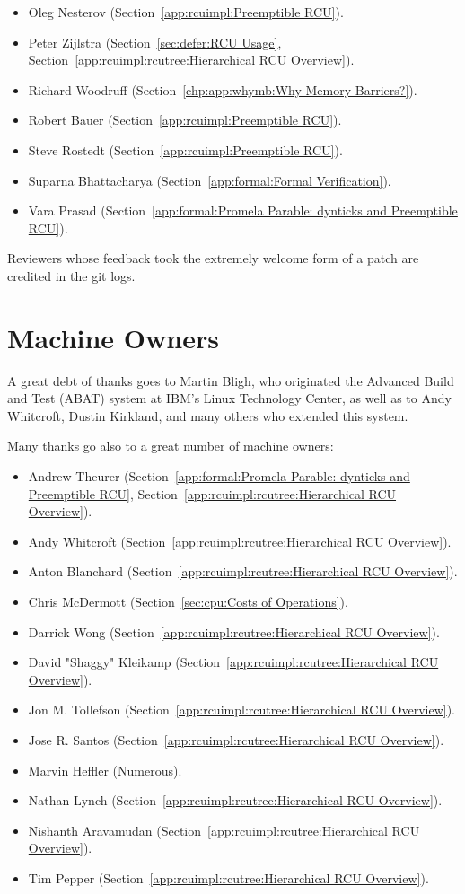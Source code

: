 \begin{itemize}
\item	Oleg Nesterov (Section~\ref{app:rcuimpl:Preemptible RCU}).
\item	Peter Zijlstra
	(Section~\ref{sec:defer:RCU Usage}, %
	Section~\ref{app:rcuimpl:rcutree:Hierarchical RCU Overview}).
\item	Richard Woodruff (Section~\ref{chp:app:whymb:Why Memory Barriers?}).
\item	Robert Bauer (Section~\ref{app:rcuimpl:Preemptible RCU}).
\item	Steve Rostedt (Section~\ref{app:rcuimpl:Preemptible RCU}).
\item	Suparna Bhattacharya
	(Section~\ref{app:formal:Formal Verification}).
\item	Vara Prasad
	(Section~\ref{app:formal:Promela Parable: dynticks and Preemptible RCU}).
\end{itemize}

Reviewers whose feedback took the extremely welcome form of a patch
are credited in the git logs.

\section{Machine Owners}

A great debt of thanks goes to Martin Bligh, who originated the
Advanced Build and Test (ABAT) system at IBM's Linux Technology
Center, as well as to Andy Whitcroft, Dustin Kirkland, and many
others who extended this system.

Many thanks go also to a great number of machine owners:

\begin{itemize}
\item	Andrew Theurer
	(Section~\ref{app:formal:Promela Parable: dynticks and Preemptible RCU},
	Section~\ref{app:rcuimpl:rcutree:Hierarchical RCU Overview}).
\item	Andy Whitcroft (Section~\ref{app:rcuimpl:rcutree:Hierarchical RCU Overview}).
\item	Anton Blanchard (Section~\ref{app:rcuimpl:rcutree:Hierarchical RCU Overview}).
\item	Chris McDermott (Section~\ref{sec:cpu:Costs of Operations}).
\item	Darrick Wong (Section~\ref{app:rcuimpl:rcutree:Hierarchical RCU Overview}).
\item	David "Shaggy" Kleikamp (Section~\ref{app:rcuimpl:rcutree:Hierarchical RCU Overview}).
\item	Jon M. Tollefson (Section~\ref{app:rcuimpl:rcutree:Hierarchical RCU Overview}).
\item	Jose R. Santos (Section~\ref{app:rcuimpl:rcutree:Hierarchical RCU Overview}).
\item	Marvin Heffler (Numerous).
\item	Nathan Lynch (Section~\ref{app:rcuimpl:rcutree:Hierarchical RCU Overview}).
\item	Nishanth Aravamudan (Section~\ref{app:rcuimpl:rcutree:Hierarchical RCU Overview}).
\item	Tim Pepper (Section~\ref{app:rcuimpl:rcutree:Hierarchical RCU Overview}).
\end{itemize}

